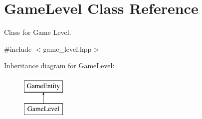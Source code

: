 \hypertarget{class_game_level}{}\section{Game\+Level Class Reference}
\label{class_game_level}


Class for Game Level.  




{\ttfamily \#include $<$game\+\_\+level.\+hpp$>$}

Inheritance diagram for Game\+Level\+:\begin{figure}[H]
\begin{center}
\leavevmode
\includegraphics[height=2.000000cm]{class_game_level}
\end{center}
\end{figure}
